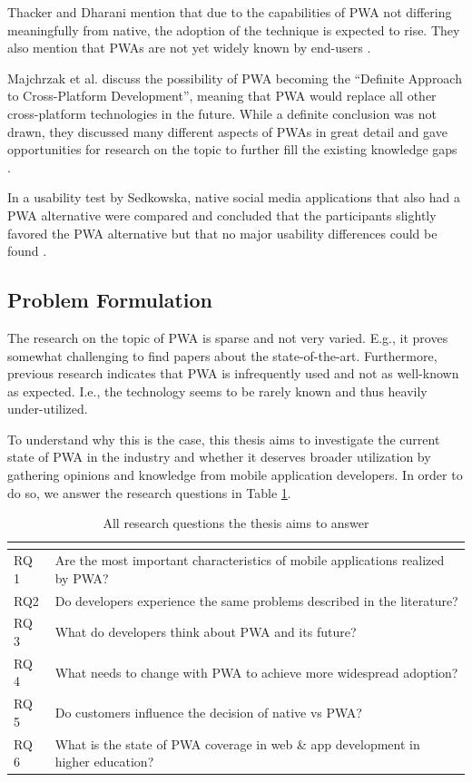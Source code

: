 \documentclass[a4paper,12pt]{article}
\begin{document}
Thacker and Dharani mention that due to the capabilities of PWA not differing meaningfully from native, the adoption of the technique is expected to rise. They also mention that PWAs are not yet widely known by end-users \cite{realize_native_with_pwa}.

Majchrzak et al. discuss the possibility of PWA becoming the “Definite Approach to Cross-Platform Development”, meaning that PWA would replace all other cross-platform technologies in the future. While a definite conclusion was not drawn, they discussed many different aspects of PWAs in great detail and gave opportunities for research on the topic to further fill the existing knowledge gaps \cite{pwa_definite_approach}.

In a usability test by Sedkowska, native social media applications that also had a PWA alternative were compared and concluded that the participants slightly favored the PWA alternative but that no major usability differences could be found \cite{thesis_pwa_ux}.

\subsection{Problem Formulation}
\label{Intro_problem}
The research on the topic of PWA is sparse and not very varied. E.g., it proves somewhat challenging to find papers about the state-of-the-art. Furthermore, previous research indicates that PWA is infrequently used and not as well-known as expected. I.e., the technology seems to be rarely known and thus heavily under-utilized.

To understand why this is the case, this thesis aims to investigate the current state of PWA in the industry and whether it deserves broader utilization by gathering opinions and knowledge from mobile application developers. In order to do so, we answer the research questions in Table \ref{tab:rqs}.

\begin{table}[t]
\centering
{}
\begin{tabular}{|l|p{12.5cm}|}
\hline
\multicolumn{2}{|c|}{\cellcolor[HTML]{343434}{\color[HTML]{FFFFFF} Research questions}} \\ \hline
RQ 1 & Are the most important characteristics of mobile applications realized by PWA? \\
RQ2 & Do developers experience the same problems described in the literature? \\
RQ 3 & What do developers think about PWA and its future? \\
RQ 4 & What needs to change with PWA to achieve more widespread adoption? \\
RQ 5 & Do customers influence the decision of native vs PWA? \\
RQ 6 & What is the state of PWA coverage in web \& app development in higher education? \\ \hline
\end{tabular}
\caption{All research questions the thesis aims to answer}
\label{tab:rqs}
\end{table}
\end{document}
